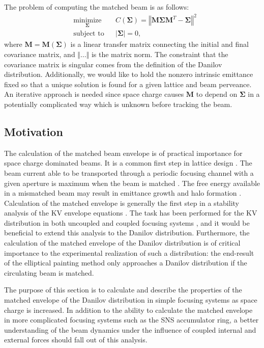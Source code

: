 The problem of computing the matched beam is as follows:
%
\begin{equation}
\begin{aligned}
    & \underset{\bm{\Sigma}}{\text{minimize}}
    & & C(\bm{\Sigma}) = \left\Vert{\mathbf{M} \bm{\Sigma} \mathbf{M}^T - \bm{\Sigma}}\right\Vert^2 \\
    & \text{subject to}
    & & |\bm{\Sigma}| = 0,
\end{aligned}
\end{equation}
%
where $\mathbf{M} = \mathbf{M}(\bm{\Sigma})$ is a linear transfer matrix connecting the initial and final covariance matrix, and $\Vert\dots\Vert$ is the matrix norm. The constraint that the covariance matrix is singular comes from the definition of the Danilov distribution. Additionally, we would like to hold the nonzero intrinsic emittance fixed so that a unique solution is found for a given lattice and beam perveance. An iterative approach is needed since space charge causes $\mathbf{M}$ to depend on $\bm{\Sigma}$ in a potentially complicated way which is unknown before tracking the beam. 


\subsection{Motivation}

The calculation of the matched beam envelope is of practical importance for space charge dominated beams. It is a common first step in lattice design \cite{Lund2006}. The beam current able to be transported through a periodic focusing channel with a given aperture is maximum when the beam is matched \cite{book:Reiser}. The free energy available in a mismatched beam may result in emittance growth and halo formation \cite{book:Reiser}. Calculation of the matched envelope is generally the first step in a stability analysis of the KV envelope equations \cite{Lund2006}. The task has been performed for the KV distribution in both uncoupled and coupled focusing systems \cite{Hofmann1983, Chernin1988, Ryne1995, Lund2006, Anderson2007, Goswami2016}, and it would be beneficial to extend this analysis to the Danilov distribution. Furthermore, the calculation of the matched envelope of the Danilov distribution is of critical importance to the experimental realization of such a distribution: the end-result of the elliptical painting method only approaches a Danilov distribution if the circulating beam is matched.

The purpose of this section is to calculate and describe the properties of the matched envelope of the Danilov distribution in simple focusing systems as space charge is increased. In addition to the ability to calculate the matched envelope in more complicated focusing systems such as the SNS accumulator ring, a better understanding of the beam dynamics under the influence of coupled internal and external forces should fall out of this analysis.

